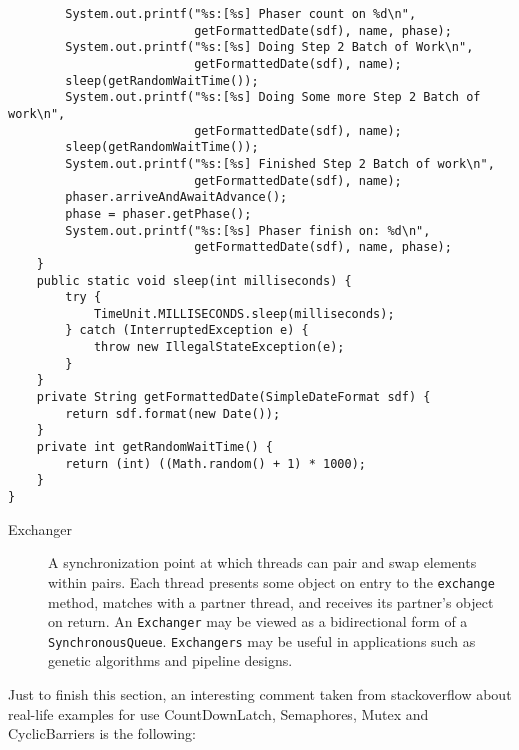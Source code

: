 \documentclass{latex/classes/myarticle}
\begin{document}
\begin{lstlisting}
        System.out.printf("%s:[%s] Phaser count on %d\n",
                          getFormattedDate(sdf), name, phase);
        System.out.printf("%s:[%s] Doing Step 2 Batch of Work\n",
                          getFormattedDate(sdf), name);
        sleep(getRandomWaitTime());
        System.out.printf("%s:[%s] Doing Some more Step 2 Batch of work\n",
                          getFormattedDate(sdf), name);
        sleep(getRandomWaitTime());
        System.out.printf("%s:[%s] Finished Step 2 Batch of work\n",
                          getFormattedDate(sdf), name);
        phaser.arriveAndAwaitAdvance();
        phase = phaser.getPhase();
        System.out.printf("%s:[%s] Phaser finish on: %d\n",
                          getFormattedDate(sdf), name, phase);
    }
    public static void sleep(int milliseconds) {
        try {
            TimeUnit.MILLISECONDS.sleep(milliseconds);
        } catch (InterruptedException e) {
            throw new IllegalStateException(e);
        }
    }
    private String getFormattedDate(SimpleDateFormat sdf) {
        return sdf.format(new Date());
    }
    private int getRandomWaitTime() {
        return (int) ((Math.random() + 1) * 1000);
    }
}
\end{lstlisting}

\begin{description}
\item[{Exchanger}] A synchronization point at which threads can pair and swap
elements within pairs. Each thread presents some object on entry to the
\texttt{exchange} method, matches with a partner thread, and receives its partner's
object on return. An \texttt{Exchanger} may be viewed as a bidirectional form of a
\texttt{SynchronousQueue}. \texttt{Exchangers} may be useful in applications such as genetic
algorithms and pipeline designs.
\end{description}

Just to finish this section, an interesting comment taken from stackoverflow
about real-life examples for use CountDownLatch, Semaphores, Mutex and
CyclicBarriers is the following:
\end{document}
